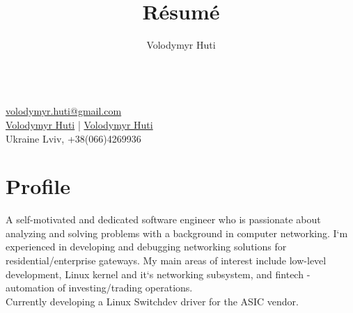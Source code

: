 \documentclass{article}
\author{Volodymyr Huti}
\title{R\'esum\'e}
\date{}
\makeatletter
\renewcommand{\maketitle}{
    \begin{center}
    {\huge\bfseries\theauthor}\\
    \vspace{.25em}
    \href{volodymyr.huti@gmail.com}{\faMailForward{} volodymyr.huti@gmail.com}\\
    \href{https://github.com/volodymyrhuti }{\faGithub{} Volodymyr Huti} |
    \href{https://www.linkedin.com/in/volodymyr-huti-b03a41156/}{\faLinkedinSquare{} Volodymyr Huti}\\
    Ukraine Lviv, +38(066)4269936 \\
    \end{center}
}
\makeatother
\begin{document}
\maketitle

\section{Profile}
A self-motivated and dedicated software engineer who is passionate about analyzing and solving problems
with a background in computer networking. I`m experienced in developing and debugging networking solutions
for residential/enterprise gateways. My main areas of interest include low-level development, Linux kernel and
it`s networking subsystem, and fintech - automation of investing/trading operations.\\
Currently developing a Linux Switchdev driver for the ASIC vendor.
\end{document}
